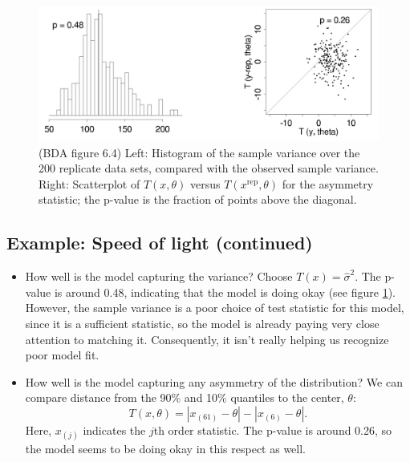 \documentclass[12pt]{article}
\newcommand{\rep}{\text{rep}}
\begin{document}
\begin{figure}
\begin{center}
\includegraphics[width=1.0\textwidth]{newcomb-more.png}
\end{center}
\caption{(BDA figure 6.4) Left: Histogram of the sample variance over the 200 replicate data sets, compared with the observed sample variance. Right: Scatterplot of $T(x,\theta)$ versus $T(x^\rep,\theta)$ for the asymmetry statistic; the p-value is the fraction of points above the diagonal.}
\label{figure:newcomb-more}
\end{figure}

\subsection*{Example: Speed of light (continued)}
\begin{itemize}
\item How well is the model capturing the variance? Choose $T(x) = \hat \sigma^2$. The p-value is around 0.48, indicating that the model is doing okay (see figure \ref{figure:newcomb-more}).  However, the sample variance is a poor choice of test statistic for this model, since it is a sufficient statistic, so the model is already paying very close attention to matching it. Consequently, it isn't really helping us recognize poor model fit.
\item How well is the model capturing any asymmetry of the distribution? We can compare distance from the 90\% and 10\% quantiles to the center, $\theta$:
$$ T(x,\theta) = | x_{(61)} - \theta | - | x_{(6)} - \theta |. $$
Here, $x_{(j)}$ indicates the $j$th order statistic.  The p-value is around 0.26, so the model seems to be doing okay in this respect as well.
\end{itemize}
\end{document}
